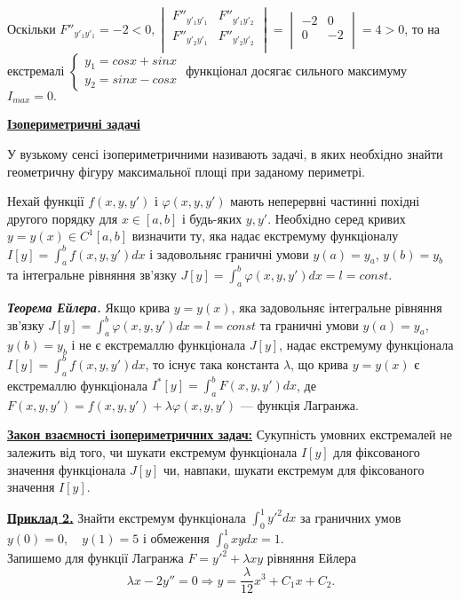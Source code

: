 \documentclass[a4paper]{article}
\begin{document}
	Оскільки $F''_{y'_1y'_1} = -2 < 0,
	\begin{vmatrix}
		F''_{y'_1y'_1} & F''_{y'_1y'_2} \\
		F''_{y'_2y'_1} & F''_{y'_2y'_2} \\
	\end{vmatrix} =
	\begin{vmatrix}
		-2 & 0 \\
		0 & -2 \\
	\end{vmatrix} = 4 > 0 $, то на екстремалі
	$\begin{cases}
		y_1 = cosx + sinx  \\
		y_2 = sinx - cosx
	\end{cases}$ функціонал досягає сильного максимуму $I_{max}= 0.$

	\begin{center}
		\underline{\textbf{Ізопериметричні задачі}}
	\end{center}
	
	У вузькому сенсі ізопериметричними називають задачі, в яких необхідно знайти геометричну фігуру
	максимальної площі при заданому периметрі.
	
	Нехай функції $f(x, y, y')$ і $\varphi(x, y, y')$
	мають неперервні частинні похідні другого порядку для $x \in [a,b]$ і будь-яких $y, y'$.
	Необхідно серед кривих $y = y(x) \in C^{1}[a, b]$ визначити ту, яка надає екстремуму функціоналу
	$I[y] = \int_{a}^{b} f(x, y, y')dx$
	і задовольняє граничні умови $y(a) = y_a$, $y(b) = y_b$
	та інтегральне рівняння зв’язку $J[y] = \int_{a}^{b} \varphi(x, y, y')dx = l = const$.


	\textit{\textbf{Теорема Ейлера.}}
		Якщо крива $y = y(x)$, яка задовольняє інтегральне рівняння зв’язку
		$J[y] = \int_{a}^{b} \varphi(x, y, y')dx = l = const$
		та граничні умови  $y(a) = y_a$, $y(b) = y_b$ і не є екстремаллю функціонала $J[y]$,
		надає екстремуму функціонала $I[y] = \int_{a}^{b} f(x, y, y')dx$,
		то існує така константа $\lambda$, що крива $y = y(x)$
		є екстремаллю функціонала $I^*[y] = \int_{a}^{b} F(x, y, y')dx$,
		де $F(x, y, y') = f(x, y, y') + \lambda \varphi(x, y , y')$ --- функція Лагранжа.

	\underline{\textbf{Закон взаємності ізопериметричних задач:}} Сукупність умовних екстремалей не залежить від того, чи шукати екстремум функціонала $I[y]$ для фіксованого значення функціонала $J[y]$ чи, навпаки, шукати екстремум для фіксованого значення $I[y]$.

	\underline{\textbf{Приклад 2.}} Знайти екстремум функціонала $\int_{0}^{1} {y'}^{2}dx$ за граничних умов
	$y(0) = 0,\quad y(1) = 5$ і обмеження $\int_{0}^{1} xydx = 1$.\\
	Запишемо для функції Лагранжа $F = {y'}^{2} + \lambda x y $ рівняння Ейлера
	$$\lambda x - 2y'' = 0 \Rightarrow y = \frac{\lambda}{12} x^3 + C_1x + C_2.$$
\end{document}
